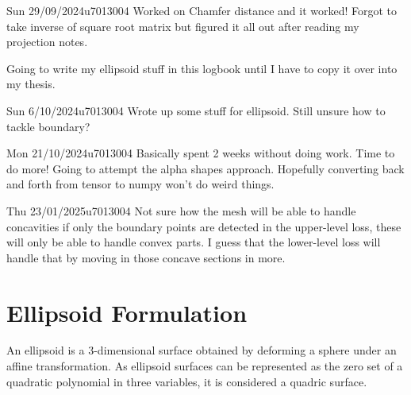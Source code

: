 \documentclass{project-logbook}
\begin{document}
	\begin{MeetingMinutes}{Sun 29/09/2024}{u7013004}
		Worked on Chamfer distance and it worked! Forgot to take inverse of square root matrix but figured it all out after reading my projection notes.

		Going to write my ellipsoid stuff in this logbook until I have to copy it over into my thesis.


	\end{MeetingMinutes}

	\begin{MeetingMinutes}{Sun 6/10/2024}{u7013004}
		Wrote up some stuff for ellipsoid. Still unsure how to tackle boundary?
	\end{MeetingMinutes}

	\begin{MeetingMinutes}{Mon 21/10/2024}{u7013004}
		Basically spent 2 weeks without doing work. Time to do more! Going to attempt the alpha shapes approach. Hopefully converting back and forth from tensor to numpy won't do weird things.
	\end{MeetingMinutes}

	\begin{MeetingMinutes}{Thu 23/01/2025}{u7013004}
		Not sure how the mesh will be able to handle concavities if only the boundary points are detected in the upper-level loss, these will only be able to handle convex parts. I guess that the lower-level loss will handle that by moving in those concave sections in more.
	\end{MeetingMinutes}

\section{Ellipsoid Formulation} \label{sec:ellipsoid}
An ellipsoid is a 3-dimensional surface obtained by deforming a sphere under an affine transformation. As ellipsoid surfaces can be represented as the zero set of a quadratic polynomial in three variables, it is considered a quadric surface.
\end{document}
